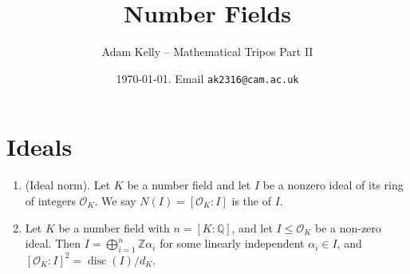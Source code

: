 \documentclass[a4paper, 10pt,]{amsart}
\title{Number Fields}
\author{Adam Kelly -- Mathematical Tripos Part II}
\date{\today. Email \texttt{ak2316@cam.ac.uk}}
\renewcommand{\OO}{\mathcal{O}}
\newcommand{\disc}{\operatorname{disc}}
\begin{document}
\maketitle



\section{Ideals}

\begin{enumerate}
  \item (Ideal norm). Let $K$ be a number field and let $I$ be a nonzero ideal of its ring of integers $\OO_K$. We say $N(I) = [\OO_K: I]$ is the  of $I$.

  \item Let $K$ be a number field with $n = [K:\mathbb{Q}]$, and let $I \leq \OO_K$ be a non-zero ideal. Then $I = \bigoplus_{i = 1}^n \mathbb{Z} \alpha_i$ for some linearly independent $\alpha_i \in I$, and $[\OO_K: I]^2 = \disc(I)/d_K$. 
\end{enumerate}





\end{document}
